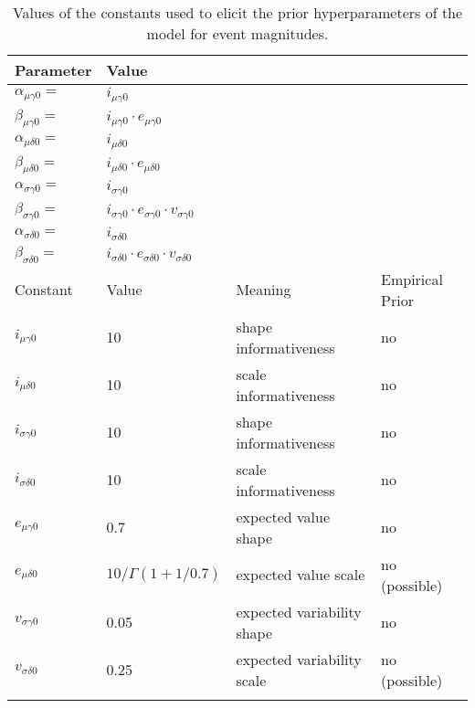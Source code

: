 \documentclass[]{article}
\begin{document}
\begin{table}
    \centering
    \caption{Values of the constants used to elicit the prior hyperparameters of the model for event magnitudes.}
    \begin{tabular}{ llll }
        \hline
        Parameter  & Value  \\ \hline
        \hline
        $\alpha_{\mu \gamma 0}=$   &  $i_{\mu \gamma 0} $ \\
        $\beta_{\mu \gamma 0}=$   &  $i_{\mu \gamma 0} \cdot e_{\mu \gamma 0} $ \\

        $\alpha_{\mu \delta 0}=$   &  $i_{\mu \delta 0} $ \\
        $\beta_{\mu \delta 0}=$   &  $i_{\mu \delta 0} \cdot e_{\mu \delta 0} $ \\

        $\alpha_{\sigma \gamma 0}=$   &  $i_{\sigma \gamma 0} $ \\
        $\beta_{\sigma \gamma 0}=$   &  $i_{\sigma \gamma 0} \cdot e_{\sigma \gamma 0} \cdot v_{\sigma \gamma 0} $ \\

        $\alpha_{\sigma \delta 0}=$   &  $i_{\sigma \delta 0} $ \\
        $\beta_{\sigma \delta 0}=$   &  $i_{\sigma \delta 0} \cdot e_{\sigma \delta 0} \cdot  v_{\sigma \delta 0} $ \\


        \hline
        Constant  & Value & Meaning & Empirical Prior \\ \hline

        $i_{\mu \gamma 0}$  & 10 & shape informativeness  & no \\
        $i_{\mu \delta 0}$  & 10 & scale informativeness & no \\

        $i_{\sigma \gamma 0}$  & 10 & shape informativeness & no \\
        $i_{\sigma \delta 0}$  & 10 & scale informativeness & no \\

        $e_{\mu \gamma 0}$  & 0.7 & expected value shape & no \\
        $e_{\mu \delta 0}$  & $10/ \Gamma \left( 1 + 1/{0.7}\right)$ & expected value scale &  no (possible)\\

        $v_{\sigma \gamma 0}$  & 0.05 & expected variability shape & no \\
        $v_{\sigma \delta 0}$  & 0.25 & expected variability scale &  no (possible) \\



        \hline



        \label{tab:priors}
    \end{tabular}
\end{table}
\end{document}
